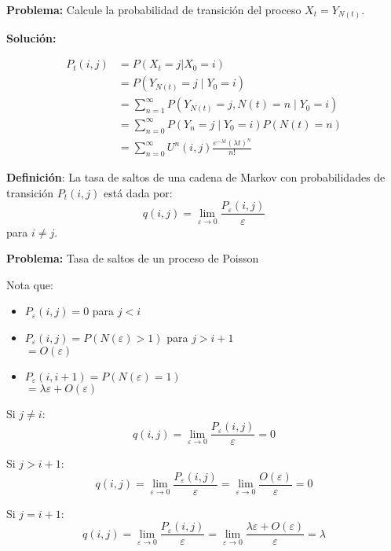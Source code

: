 \documentclass[12pt,a4paper]{article}
\newcommand{\definicion}[1]{%
\begin{definicionbox}
\textbf{Definición}: #1
\end{definicionbox}
}
\begin{document}
\textbf{Problema:} Calcule la probabilidad de transición del proceso $X_t = Y_{N(t)}$.

\textbf{Solución:}

\begin{align*}
P_t(i,j) &= P(X_t = j | X_0 = i) \\
&= P\left(Y_{N(t)} = j \mid Y_0 = i\right) \\
&= \sum_{n=1}^{\infty} P\left(Y_{N(t)} = j, N(t) = n \mid Y_0 = i\right) \\
&= \sum_{n=0}^{\infty} P\left(Y_n = j \mid Y_0 = i\right) P(N(t) = n) \\
&= \sum_{n=0}^{\infty} U^n(i,j) \frac{e^{-\lambda t}(\lambda t)^n}{n!}
\end{align*}

\definicion{La tasa de saltos de una cadena de Markov con probabilidades de transición $P_t(i,j)$ está dada por:
\begin{equation*}
q(i,j) = \lim_{\varepsilon \to 0} \frac{P_\varepsilon(i,j)}{\varepsilon}
\end{equation*}
para $i \neq j$.}

\textbf{Problema:} Tasa de saltos de un proceso de Poisson

Nota que:

\begin{itemize}
    \item $P_\varepsilon(i,j) = 0$ para $j < i$
    \item $P_\varepsilon(i,j) = P(N(\varepsilon) > 1)$ para $j > i+1$\\
    \hspace{1.5em} $= O(\varepsilon)$
    \item $P_\varepsilon(i, i+1) = P(N(\varepsilon) = 1)$\\
    \hspace{1.5em} $= \lambda\varepsilon + O(\varepsilon)$
\end{itemize}

Si $j \neq i$:
\begin{equation*}
q(i,j) = \lim_{\varepsilon \to 0} \frac{P_\varepsilon(i,j)}{\varepsilon} = 0
\end{equation*}

Si $j > i+1$:
\begin{equation*}
q(i,j) = \lim_{\varepsilon \to 0} \frac{P_\varepsilon(i,j)}{\varepsilon} = \lim_{\varepsilon \to 0} \frac{O(\varepsilon)}{\varepsilon} = 0
\end{equation*}

Si $j = i+1$:
\begin{equation*}
q(i,j) = \lim_{\varepsilon \to 0} \frac{P_\varepsilon(i,j)}{\varepsilon} = \lim_{\varepsilon \to 0} \frac{\lambda\varepsilon + O(\varepsilon)}{\varepsilon} = \lambda
\end{equation*}
\end{document}
